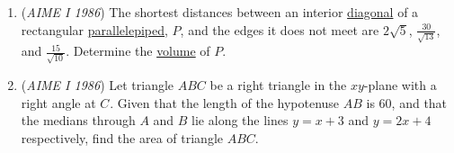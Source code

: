 \begin{enumerate}
 

	\item (\textit{AIME I 1986}) The shortest distances between an interior \href{https://artofproblemsolving.com/wiki/index.php?title=Diagonal}{diagonal} of a rectangular \href{https://artofproblemsolving.com/wiki/index.php?title=Parallelepiped}{parallelepiped}, $P$, and the edges it does not meet are $2\sqrt{5}$, $\frac{30}{\sqrt{13}}$, and $\frac{15}{\sqrt{10}}$. Determine the \href{https://artofproblemsolving.com/wiki/index.php?title=Volume}{volume} of $P$.


 

	\item (\textit{AIME I 1986}) Let triangle $ABC$ be a right triangle in the $xy$-plane with a right angle at $C_{}$. Given that the length of the hypotenuse $AB$ is $60$, and that the medians through $A$ and $B$ lie along the lines $y=x+3$ and $y=2x+4$ respectively, find the area of triangle $ABC$.


 

\end{enumerate}